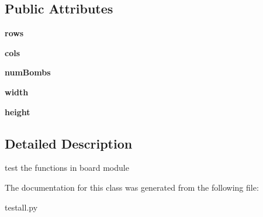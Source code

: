 \subsection*{Public Attributes}
\begin{CompactItemize}
\item 
\textbf{rows}\label{classtestall_1_1BoardTest_211332a4c129734af970fb841209b5d6}

\item 
\textbf{cols}\label{classtestall_1_1BoardTest_b9fc53e86355234aa97de7d6fc71181b}

\item 
\textbf{num\-Bombs}\label{classtestall_1_1BoardTest_7e39d3a1e72988d66120efc59ada301e}

\item 
\textbf{width}\label{classtestall_1_1BoardTest_60c3fdde73def49a46b3407e58e33a58}

\item 
\textbf{height}\label{classtestall_1_1BoardTest_515153ffdb7c1d6416c5ba4d9a6da775}

\end{CompactItemize}


\subsection{Detailed Description}
test the functions in board module 



The documentation for this class was generated from the following file:\begin{CompactItemize}
\item 
testall.py\end{CompactItemize}
